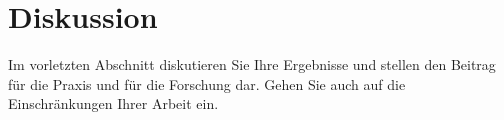 \section{Diskussion}
\label{cha:diskussion}
Im vorletzten Abschnitt diskutieren Sie Ihre Ergebnisse und stellen den Beitrag für die Praxis und für die Forschung dar. Gehen Sie auch auf die Einschränkungen Ihrer Arbeit ein.